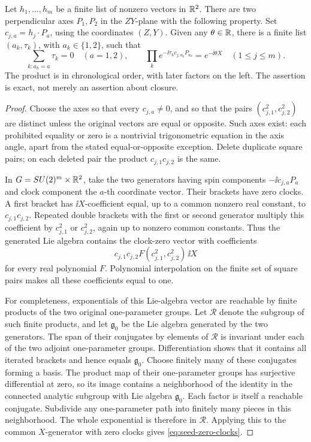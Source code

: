 \begin{lemma}
\label{lem:seed-ensemble-control}
Let \(h_1,\ldots,h_m\) be a finite list of nonzero vectors in \(\mathbb R^2\).
There are two perpendicular axes \(P_1,P_2\) in the \(ZY\)-plane with
the following property.  Set \(c_{j,a}=h_j\cdot P_a\), using the
coordinates \((Z,Y)\).  Given any \(\theta\in\mathbb R\), there is a finite
list \((a_k,\tau_k)\), with \(a_k\in\{1,2\}\), such that
\begin{equation}
\label{eq:seed-zero-clocks}
 \sum_{k:a_k=a}\tau_k=0\quad(a=1,2),
 \qquad
 \prod_k e^{-\ii\tau_k c_{j,a_k}P_{a_k}}
 =e^{-\ii\theta X}\quad(1\leq j\leq m).
\end{equation}
The product is in chronological order, with later factors on the left.
The assertion is exact, not merely an assertion about closure.
\end{lemma}

\begin{proof}
Choose the axes so that every \(c_{j,a}\neq0\), and so that the pairs
\((c_{j,1}^2,c_{j,2}^2)\) are distinct unless the original vectors are
equal or opposite.  Such axes exist: each prohibited equality or zero is
a nontrivial trigonometric equation in the axis angle, apart from the
stated equal-or-opposite exception.  Delete duplicate square pairs; on
each deleted pair the product \(c_{j,1}c_{j,2}\) is the same.

In \(G=SU(2)^m\times\mathbb R^2\), take the two generators having spin
components \(-\ii c_{j,a}P_a\) and clock component the \(a\)-th
coordinate vector.  Their brackets have zero clocks.  A first bracket
has \(\ii X\)-coefficient equal, up to a common nonzero real constant,
to \(c_{j,1}c_{j,2}\).  Repeated double brackets with the first or
second generator multiply this coefficient by \(c_{j,1}^2\) or
\(c_{j,2}^2\), again up to nonzero common constants.  Thus the generated
Lie algebra contains the clock-zero vector with coefficients
\[
 c_{j,1}c_{j,2}F(c_{j,1}^2,c_{j,2}^2)\,\ii X
\]
for every real polynomial \(F\).  Polynomial interpolation on the finite
set of square pairs makes all these coefficients equal to one.

For completeness, exponentials of this Lie-algebra vector are reachable
by finite products of the two original one-parameter groups.  Let
\(\mathcal R\) denote the subgroup of such finite products, and let
\(\mathfrak g_0\) be the Lie algebra generated by the two generators.
The span of their conjugates by elements of \(\mathcal R\) is invariant
under each of the two adjoint one-parameter groups.  Differentiation
shows that it contains all iterated brackets and hence equals
\(\mathfrak g_0\).  Choose finitely many of these conjugates forming a
basis.  The product map of their one-parameter groups has surjective
differential at zero, so its image contains a neighborhood of the
identity in the connected analytic subgroup with Lie algebra
\(\mathfrak g_0\).  Each factor is itself a reachable conjugate.
Subdivide any one-parameter path into finitely many pieces in this
neighborhood.  The whole exponential is therefore in \(\mathcal R\).
Applying this to the common \(X\)-generator with zero clocks gives
\eqref{eq:seed-zero-clocks}.
\end{proof}

